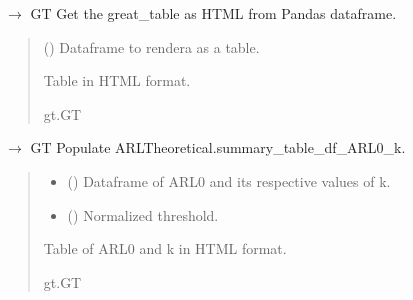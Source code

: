\documentclass[letterpaper,10pt,oneside,english]{sphinxmanual}
\begin{document}
\begin{fulllineitems}
\label{\detokenize{ref_utils:package.utils.get_greattable_as_html}}
\pysigstartsignatures
\pysiglinewithargsret
{}
{}
{{ $\rightarrow$ GT}}
\pysigstopsignatures
\sphinxAtStartPar
Get the great\_table as HTML from Pandas dataframe.
\begin{quote}\begin{description}
\sphinxAtStartPar
{} () \textendash{} Dataframe to rendera as a table.

\sphinxAtStartPar
Table in HTML format.

\sphinxAtStartPar
gt.GT

\end{description}\end{quote}

\end{fulllineitems}


\begin{fulllineitems}
\label{\detokenize{ref_utils:package.utils.populate_summary_table_ARL0_k}}
\pysigstartsignatures
\pysiglinewithargsret
{}
{\sphinxparamcomma {}}
{{ $\rightarrow$ GT}}
\pysigstopsignatures
\sphinxAtStartPar
Populate ARLTheoretical.summary\_table\_df\_ARL0\_k.
\begin{quote}\begin{description}
\begin{itemize}
\item {} 
\sphinxAtStartPar
{} () \textendash{} Dataframe of ARL0 and its respective values of k.

\item {} 
\sphinxAtStartPar
{} () \textendash{} Normalized threshold.

\end{itemize}

\sphinxAtStartPar
Table of ARL0 and k in HTML format.

\sphinxAtStartPar
gt.GT

\end{description}\end{quote}

\end{fulllineitems}
\end{document}
